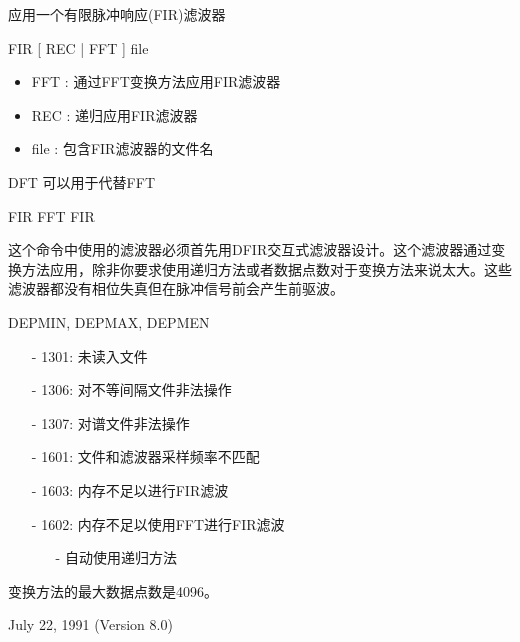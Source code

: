 \label{cmd:fir}

应用一个有限脉冲响应(FIR)滤波器

FIR [ REC | FFT ] file

\begin{itemize}
\item FFT : 通过FFT变换方法应用FIR滤波器
\item REC : 递归应用FIR滤波器
\item file : 包含FIR滤波器的文件名
\end{itemize}
 
DFT 可以用于代替FFT

FIR FFT FIR

这个命令中使用的滤波器必须首先用DFIR交互式滤波器设计。这个滤波器通过变换方法应用，除非你要求使用递归方法或者数据点数对于变换方法来说太大。这些滤波器都没有相位失真但在脉冲信号前会产生前驱波。

DEPMIN, DEPMAX, DEPMEN

\begin{itemize}
\item[-]1301: 未读入文件
\item[-]1306: 对不等间隔文件非法操作
\item[-]1307: 对谱文件非法操作
\item[-]1601: 文件和滤波器采样频率不匹配
\item[-]1603: 内存不足以进行FIR滤波
\end{itemize}

\begin{itemize}
\item[-]1602: 内存不足以使用FFT进行FIR滤波
	\begin{itemize}
	\item[-]自动使用递归方法
	\end{itemize}
\end{itemize}

变换方法的最大数据点数是4096。

July 22, 1991 (Version 8.0)
